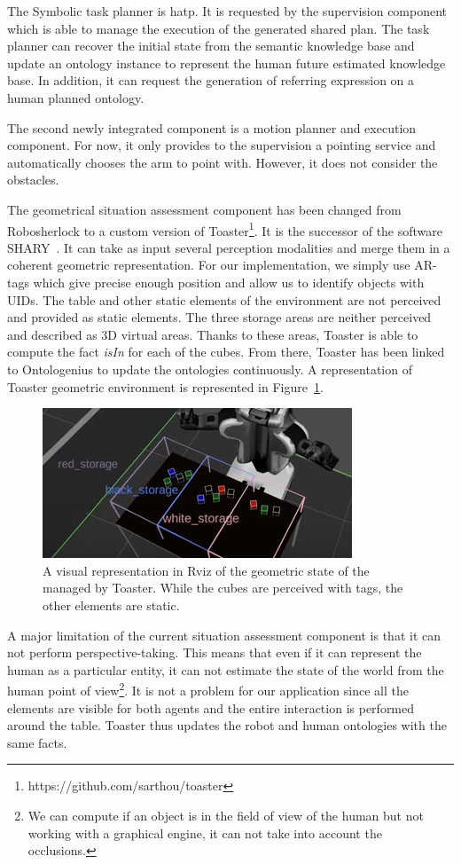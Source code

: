 The Symbolic task planner is \acrshort{hatp}. It is requested by the supervision component which is able to manage the execution of the generated shared plan. The task planner can recover the initial state from the semantic knowledge base and update an ontology instance to represent the human future estimated knowledge base. In addition, it can request the generation of referring expression on a human planned ontology.

The second newly integrated component is a motion planner and execution component. For now, it only provides to the supervision a pointing service and automatically chooses the arm to point with. However, it does not consider the obstacles.

The geometrical situation assessment component has been changed from Robosherlock to a custom version of Toaster\footnote{https://github.com/sarthou/toaster}. It is the successor of the software SHARY~\cite{milliez_2014_framework}. It can take as input several perception modalities and merge them in a coherent geometric representation. For our implementation, we simply use AR-tags which give precise enough position and allow us to identify objects with UIDs. The table and other static elements of the environment are not perceived and provided as static elements. The three storage areas are neither perceived and described as 3D virtual areas. Thanks to these areas, Toaster is able to compute the fact \textit{isIn} for each of the cubes. From there, Toaster has been linked to Ontologenius to update the ontologies continuously. A representation of Toaster geometric environment is represented in Figure~\ref{fig:chap5_toaster}.

\begin{figure}[!ht]
\centering
\includegraphics[scale=0.70]{figures/chapter5/toaster.png}
\caption{\label{fig:chap5_toaster} A visual representation in Rviz of the geometric state of the managed by Toaster. While the cubes are perceived with tags, the other elements are static.
 }
\end{figure}

A major limitation of the current situation assessment component is that it can not perform perspective-taking. This means that even if it can represent the human as a particular entity, it can not estimate the state of the world from the human point of view\footnote{We can compute if an object is in the field of view of the human but not working with a graphical engine, it can not take into account the occlusions.}. It is not a problem for our application since all the elements are visible for both agents and the entire interaction is performed around the table. Toaster thus updates the robot and human ontologies with the same facts.
